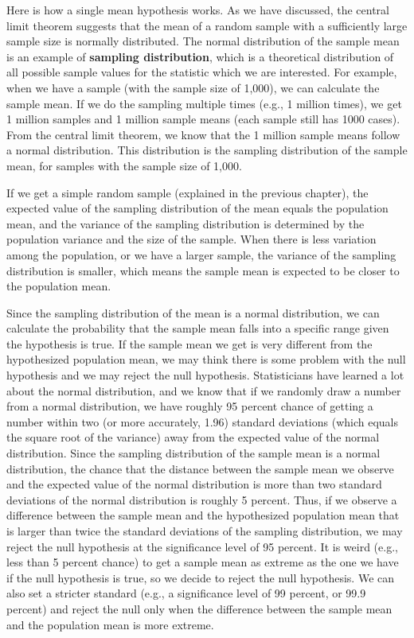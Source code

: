 \documentclass{book}
\begin{document}
Here is how a single mean hypothesis works. As we have discussed, the central
limit theorem suggests that the mean of a random sample with a sufficiently
large sample size is normally distributed. The normal distribution of the
sample mean is an example of \textbf{sampling distribution}, which is a
theoretical distribution of all possible sample values for the statistic which
we are interested. For example, when we have a sample (with the sample size of
1,000), we can calculate the sample mean. If we do the sampling multiple times
(e.g., 1 million times), we get 1 million samples and 1 million sample means
(each sample still has 1000 cases). From the central limit theorem, we know
that the 1 million sample means follow a normal distribution. This
distribution is the sampling distribution of the sample mean, for samples with
the sample size of 1,000.

If we get a simple random sample (explained in the previous chapter), the
expected value of the sampling distribution of the mean equals the population
mean, and the variance of the sampling distribution is determined by the
population variance and the size of the sample. When there is less variation
among the population, or we have a larger sample, the variance of the sampling
distribution is smaller, which means the sample mean is expected to be closer
to the population mean.

Since the sampling distribution of the mean is a normal distribution, we can
calculate the probability that the sample mean falls into a specific range
given the hypothesis is true. If the sample mean we get is very different from
the hypothesized population mean, we may think there is some problem with the
null hypothesis and we may reject the null hypothesis. Statisticians have
learned a lot about the normal distribution, and we know that if we randomly
draw a number from a normal distribution, we have roughly 95 percent chance of
getting a number within two (or more accurately, 1.96) standard deviations
(which equals the square root of the variance) away from the expected value of
the normal distribution. Since the sampling distribution of the sample mean is
a normal distribution, the chance that the distance between the sample mean we
observe and the expected value of the normal distribution is more than two
standard deviations of the normal distribution is roughly 5 percent. Thus, if
we observe a difference between the sample mean and the hypothesized
population mean that is larger than twice the standard deviations of the
sampling distribution, we may reject the null hypothesis at the significance
level of 95 percent. It is weird (e.g., less than 5 percent chance) to get a
sample mean as extreme as the one we have if the null hypothesis is true, so
we decide to reject the null hypothesis. We can also set a stricter standard
(e.g., a significance level of 99 percent, or 99.9 percent) and reject the
null only when the difference between the sample mean and the population mean
is more extreme.
\end{document}
